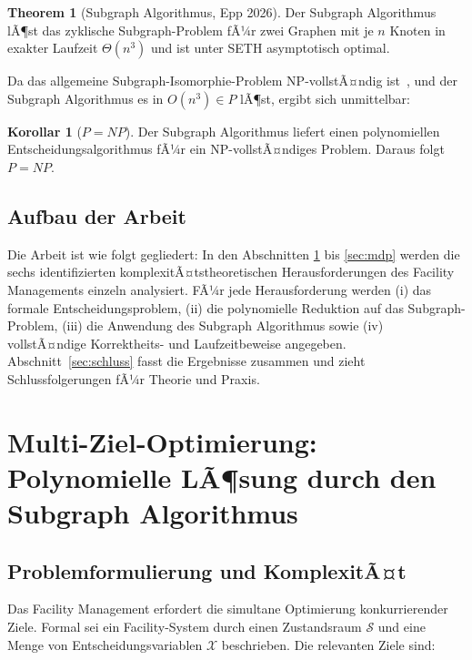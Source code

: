 ﻿\documentclass[a4paper,12pt]{article}
\theoremstyle{definition}
\newtheorem{korollar}{Korollar}[section]
\newtheorem{theorem}{Theorem}[section]
\begin{document}
\begin{theorem}[Subgraph Algorithmus, Epp 2026]
\label{thm:subgraph}
Der Subgraph Algorithmus lÃ¶st das zyklische Subgraph-Problem fÃ¼r zwei Graphen mit
je $n$ Knoten in exakter Laufzeit $\Theta(n^3)$ und ist unter SETH asymptotisch optimal.
\end{theorem}

Da das allgemeine Subgraph-Isomorphie-Problem NP-vollstÃ¤ndig ist~\cite{garey1979},
und der Subgraph Algorithmus es in $O(n^3) \in P$ lÃ¶st, ergibt sich unmittelbar:

\begin{korollar}[$P = NP$]
\label{kor:pnp}
Der Subgraph Algorithmus liefert einen polynomiellen Entscheidungsalgorithmus fÃ¼r
ein NP-vollstÃ¤ndiges Problem. Daraus folgt $P = NP$.
\end{korollar}

\subsection{Aufbau der Arbeit}

Die Arbeit ist wie folgt gegliedert: In den Abschnitten \ref{sec:mop} bis \ref{sec:mdp}
werden die sechs identifizierten komplexitÃ¤tstheoretischen Herausforderungen des
Facility Managements einzeln analysiert. FÃ¼r jede Herausforderung werden
(i) das formale Entscheidungsproblem, (ii) die polynomielle Reduktion auf das
Subgraph-Problem, (iii) die Anwendung des Subgraph Algorithmus sowie
(iv) vollstÃ¤ndige Korrektheits- und Laufzeitbeweise angegeben.
Abschnitt~\ref{sec:schluss} fasst die Ergebnisse zusammen und zieht
Schlussfolgerungen fÃ¼r Theorie und Praxis.

\section{Multi-Ziel-Optimierung: Polynomielle LÃ¶sung durch den Subgraph Algorithmus}
\label{sec:mop}

\subsection{Problemformulierung und KomplexitÃ¤t}

Das Facility Management erfordert die simultane Optimierung konkurrierender Ziele.
Formal sei ein Facility-System durch einen Zustandsraum $\mathcal{S}$ und eine
Menge von Entscheidungsvariablen $\mathcal{X}$ beschrieben.
Die relevanten Ziele sind:
\end{document}
